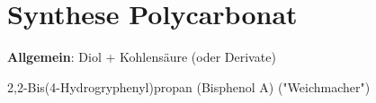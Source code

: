 \section{Synthese Polycarbonat}

\textbf{Allgemein}: Diol + Kohlensäure (oder Derivate)


2,2-Bis(4-Hydrogryphenyl)propan (Bisphenol A) ("Weichmacher")
